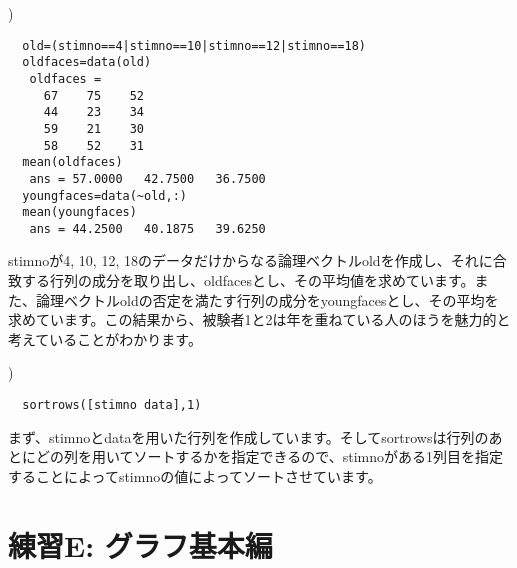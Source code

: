 \documentclass{jsarticle}
\begin{document}
\bigskip

)

\begin{verbatim}
  old=(stimno==4|stimno==10|stimno==12|stimno==18)
  oldfaces=data(old)
   oldfaces =
     67    75    52
     44    23    34
     59    21    30
     58    52    31
  mean(oldfaces)
   ans = 57.0000   42.7500   36.7500
  youngfaces=data(~old,:)
  mean(youngfaces)
   ans = 44.2500   40.1875   39.6250
\end{verbatim}

\begin{screen}
stimnoが4, 10, 12, 18のデータだけからなる論理ベクトルoldを作成し、それに合致する行列の成分を取り出し、oldfacesとし、その平均値を求めています。また、論理ベクトルoldの否定を満たす行列の成分をyoungfacesとし、その平均を求めています。この結果から、被験者1と2は年を重ねている人のほうを魅力的と考えていることがわかります。
\end{screen}

\bigskip

)

\begin{verbatim}
  sortrows([stimno data],1)
\end{verbatim}

\begin{screen}
まず、stimnoとdataを用いた行列を作成しています。そしてsortrowsは行列のあとにどの列を用いてソートするかを指定できるので、stimnoがある1列目を指定することによってstimnoの値によってソートさせています。
\end{screen}

\bigskip

\section{練習E: グラフ基本編}
\end{document}
